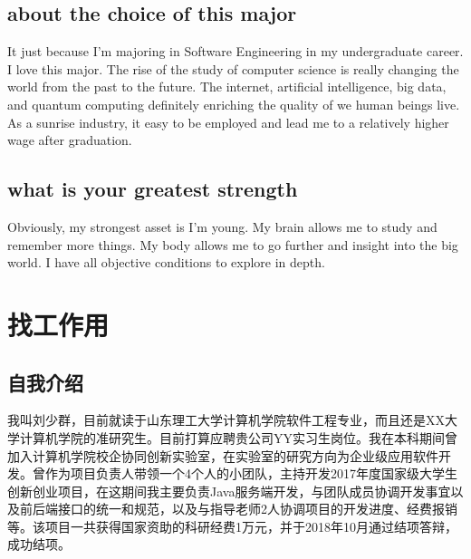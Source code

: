 \documentclass[a4paper]{report}
\begin{document}
\subsection{about the choice of this major}
It just because I'm majoring in Software Engineering in my undergraduate career. I love this major. The rise of the study of computer science is really changing the world from the past to the future. The internet, artificial intelligence, big data, and quantum computing definitely enriching the quality of we human beings live. As a sunrise industry, it easy to be employed and lead me to a relatively higher wage after graduation.

\subsection{what is your greatest strength}
Obviously, my strongest asset is I'm young. My brain allows me to study and remember more things. My body allows me to go further and insight into the big world. I have all objective conditions to explore in depth.

\section{找工作用}
\subsection{自我介绍}
我叫刘少群，目前就读于山东理工大学计算机学院软件工程专业，而且还是XX大学计算机学院的准研究生。目前打算应聘贵公司YY实习生岗位。我在本科期间曾加入计算机学院校企协同创新实验室，在实验室的研究方向为企业级应用软件开发。曾作为项目负责人带领一个4个人的小团队，主持开发2017年度国家级大学生创新创业项目，在这期间我主要负责Java服务端开发，与团队成员协调开发事宜以及前后端接口的统一和规范，以及与指导老师2人协调项目的开发进度、经费报销等。该项目一共获得国家资助的科研经费1万元，并于2018年10月通过结项答辩，成功结项。
\end{document}

